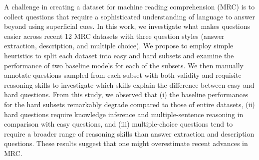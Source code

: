 A challenge in creating a dataset for machine reading comprehension (MRC) is to collect questions that require a sophisticated understanding of language to answer beyond using superficial cues. In this work, we investigate what makes questions easier across recent 12 MRC datasets with three question styles (answer extraction, description, and multiple choice). We propose to employ simple heuristics to split each dataset into easy and hard subsets and examine the performance of two baseline models for each of the subsets. We then manually annotate questions sampled from each subset with both validity and requisite reasoning skills to investigate which skills explain the difference between easy and hard questions. From this study, we observed that (i) the baseline performances for the hard subsets remarkably degrade compared to those of entire datasets, (ii) hard questions require knowledge inference and multiple-sentence reasoning in comparison with easy questions, and (iii) multiple-choice questions tend to require a broader range of reasoning skills than answer extraction and description questions. These results suggest that one might overestimate recent advances in MRC.
